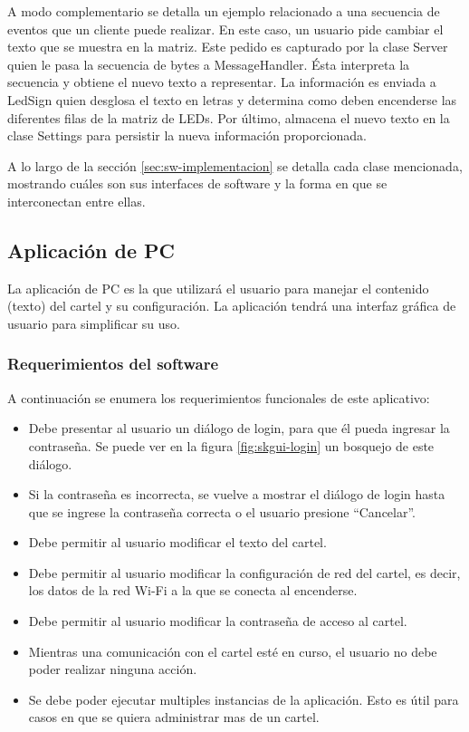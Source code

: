 A modo complementario se detalla un ejemplo relacionado a una secuencia de eventos que un cliente puede realizar.
En este caso, un usuario pide cambiar el texto que se muestra en la matriz. Este pedido es capturado por la clase Server quien le pasa la secuencia de bytes a MessageHandler.
Ésta interpreta la secuencia y obtiene el nuevo texto a representar. La información es enviada a LedSign quien desglosa el texto en letras y determina como deben encenderse las diferentes filas de la matriz de LEDs.
Por último, almacena el nuevo texto en la clase Settings para persistir la nueva información proporcionada.

A lo largo de la sección \ref{sec:sw-implementacion} se detalla cada clase mencionada, mostrando cuáles son sus interfaces de software y la forma en que se interconectan entre ellas.

\subsection{Aplicación de PC}

La aplicación de PC es la que utilizará el usuario para manejar el contenido (texto) del cartel y su configuración. La aplicación tendrá una interfaz gráfica de usuario para simplificar su uso.

\subsubsection{Requerimientos del software}\label{sec:sw-pc-req}
A continuación se enumera los requerimientos funcionales de este aplicativo:

\begin{itemize}
	\item Debe presentar al usuario un diálogo de login, para que él pueda ingresar la contraseña. Se puede ver en la figura \ref{fig:skgui-login} un bosquejo de este diálogo.
	\item Si la contraseña es incorrecta, se vuelve a mostrar el diálogo de login hasta que se ingrese la contraseña correcta o el usuario presione \enquote{Cancelar}.
	\item Debe permitir al usuario modificar el texto del cartel.
	\item Debe permitir al usuario modificar la configuración de red del cartel, es decir, los datos de la red Wi-Fi a la que se conecta al encenderse.
	\item Debe permitir al usuario modificar la contraseña de acceso al cartel.
	\item Mientras una comunicación con el cartel esté en curso, el usuario no debe poder realizar ninguna acción.
	\item Se debe poder ejecutar multiples instancias de la aplicación. Esto es útil para casos en que se quiera administrar mas de un cartel.
\end{itemize}

